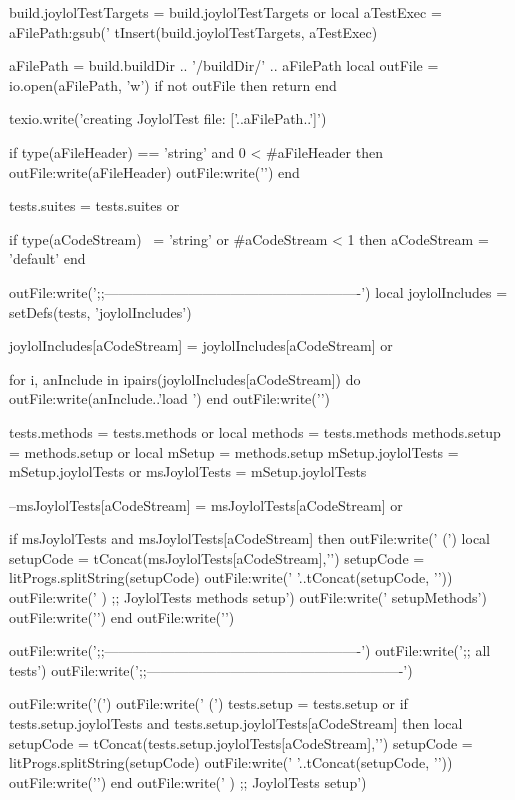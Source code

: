   build.joylolTestTargets = build.joylolTestTargets or { }
  local aTestExec = aFilePath:gsub('%
  tInsert(build.joylolTestTargets, aTestExec)

  aFilePath = build.buildDir .. '/buildDir/' .. aFilePath
  local outFile = io.open(aFilePath, 'w')
  if not outFile then
    return
  end
  
  texio.write('creating JoylolTest file: ['..aFilePath..']\n')
  
  if type(aFileHeader) == 'string'
    and 0 < #aFileHeader then
    outFile:write(aFileHeader)
    outFile:write('\n\n')
  end

  tests.suites = tests.suites or { }

  if type(aCodeStream) ~= 'string'
    or #aCodeStream < 1 then
    aCodeStream = 'default'
  end

  outFile:write(';;-------------------------------------------------------\n')
  local joylolIncludes = setDefs(tests, 'joylolIncludes')

  joylolIncludes[aCodeStream] = joylolIncludes[aCodeStream] or { }

  for i, anInclude in ipairs(joylolIncludes[aCodeStream]) do
    outFile:write(anInclude..'load \n')
  end
  outFile:write('\n\n')

  tests.methods = tests.methods or { }
  local methods = tests.methods
  methods.setup = methods.setup or { }
  local mSetup  = methods.setup
  mSetup.joylolTests = mSetup.joylolTests or { }
  msJoylolTests      = mSetup.joylolTests

  --msJoylolTests[aCodeStream] = msJoylolTests[aCodeStream] or { }

  if msJoylolTests and
    msJoylolTests[aCodeStream] then
    outFile:write('  (\n')
    local setupCode = tConcat(msJoylolTests[aCodeStream],'\n')
    setupCode       = litProgs.splitString(setupCode)
    outFile:write('  '..tConcat(setupCode, '\n  '))
    outFile:write('  ) ;; JoylolTests methods setup\n')
    outFile:write('  setupMethods\n')
    outFile:write('\n\n')
  end
  outFile:write('\n\n')

  outFile:write(';;-------------------------------------------------------\n')
  outFile:write(';; all tests\n')
  outFile:write(';;-------------------------------------------------------\n')

  outFile:write('(\n')
  outFile:write('  (\n')
  tests.setup = tests.setup or { }
  if tests.setup.joylolTests and
    tests.setup.joylolTests[aCodeStream] then
    local setupCode = tConcat(tests.setup.joylolTests[aCodeStream],'\n')
    setupCode       = litProgs.splitString(setupCode)
    outFile:write('  '..tConcat(setupCode, '\n  '))
    outFile:write('\n\n')
  end
  outFile:write('  ) ;; JoylolTests setup\n\n')

